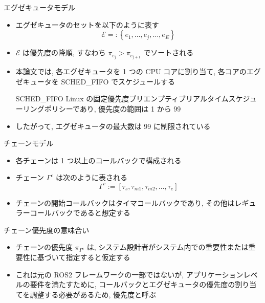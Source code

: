 \begin{frame}{エグゼキュータモデル}
    \begin{itemize}
        \item エグゼキュータのセットを以下のように表す
              \vspace{-2mm}
              \begin{equation*}
                  \mathcal{E}=:\left\{e_{1}, \ldots, e_{j}, \ldots, e_{E}\right\}
              \end{equation*}

        \item $\mathcal{E}$ は優先度の降順, すなわち $\pi_{e_{j}}>\pi_{e_{j+1}}$ でソートされる
        \item 本論文では, 各エグゼキュータを 1 つの CPU コアに割り当て, 各コアのエグゼキュータを SCHED\_FIFO でスケジュールする
              \begin{block}{SCHED\_FIFO}
                  Linux の固定優先度プリエンプティブリアルタイムスケジューリングポリシーであり, 優先度の範囲は 1 から 99
              \end{block}
              \vspace{5mm}
        \item したがって, エグゼキュータの最大数は 99 に制限されている
    \end{itemize}
\end{frame}

\begin{frame}{チェーンモデル}
    \begin{itemize}
        \item 各チェーンは 1 つ以上のコールバックで構成される
        \item チェーン $\Gamma^{c}$ は次のように表される
              \vspace{-2mm}
              \begin{equation*}
                  \Gamma^{c}:=\left[\tau_{s}, \tau_{m 1}, \tau_{m 2}, \ldots, \tau_{e}\right]
              \end{equation*}
        \item チェーンの開始コールバックはタイマコールバックであり, その他はレギュラーコールバックであると想定する
    \end{itemize}
\end{frame}

\begin{frame}{チェーン優先度の意味合い}
    \begin{itemize}
        \item チェーンの優先度 $\pi_{\Gamma^{c}}$ は, システム設計者がシステム内での重要性または重要性に基づいて指定すると仮定する
        \item これは元の ROS2 フレームワークの一部ではないが, アプリケーションレベルの要件を満たすために, コールバックとエグゼキュータの優先度の割り当てを調整する必要があるため, 優先度と呼ぶ
    \end{itemize}
\end{frame}
